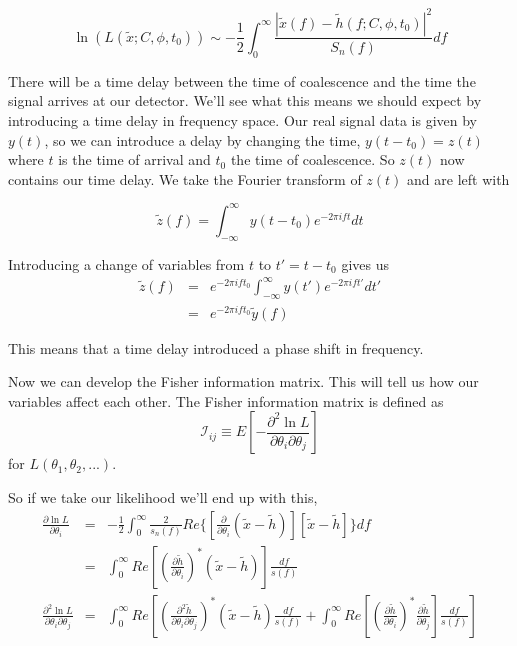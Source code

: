 \documentclass{iopart}
\begin{document}
\begin{equation}
	\ln(L(\tilde{x}; C, \phi, t_0)) \sim -\frac{1}{2}\int_0 ^\infty \frac{|\tilde{x}(f) - \tilde{h}(f; C, \phi, t_0)|^2}{S_n(f)}df
\end{equation}

There will be a time delay between the time of coalescence and the time the signal arrives at our detector. We'll see what this means we should expect by introducing a time delay in frequency space. Our real signal data is given by $y(t)$, so we can introduce a delay by changing the time, $y(t - t_0) = z(t)$ where $t$ is the time of arrival and $t_0$ the time of coalescence. So $z(t)$ now contains our time delay. We take the Fourier transform of $z(t)$ and are left with

\begin{equation}
	\tilde{z}(f) = \int^{\infty}_{-\infty}y(t-t_0)e^{-2\pi ift} dt
\end{equation}

Introducing a change of variables from $t$ to $t' = t - t_0$ gives us
\begin{eqnarray}
	\tilde{z}(f) & = & e^{-2\pi ift_0} \int_{-\infty}^{\infty}y(t')e^{-2\pi ift'} dt' \\
	& = & e^{-2\pi ift_0} \tilde{y}(f)
\end{eqnarray}

This means that a time delay introduced a phase shift in frequency. 

Now we can develop the Fisher information matrix. This will tell us how our variables affect each other. The Fisher information matrix is defined as 
\begin{equation}
\mathcal{I}_{ij} \equiv E[-\frac{\partial^2 \ln L}{\partial \theta_i \partial \theta_j}]
\end{equation}
 for $L(\theta_1, \theta_2, ...)$.

So if we take our likelihood we'll end up with this,
\begin{eqnarray}
	\frac{\partial \ln L}{\partial \theta_i} & = & -\frac{1}{2} \int_0 ^\infty \frac{2}{s_n(f)}Re\{[\frac{\partial}{\partial \theta_i} (\tilde{x} - \tilde{h})][\tilde{x} - \tilde{h}]\}df \\
	& = & \int_0 ^\infty Re[(\frac{\partial \tilde{h}}{\partial \theta_i})^*(\tilde{x} - \tilde{h})]\frac{df}{s(f)} \\
	\frac{\partial^2 \ln L}{\partial \theta_i \partial \theta_j} & = & \int_0 ^\infty Re[(\frac{\partial^2 \tilde{h}}{\partial \theta_i \partial \theta_j})^*(\tilde{x} - \tilde{h})\frac{df}{s(f)} + \int_0 ^\infty Re[(\frac{\partial \tilde{h}}{\partial \theta_i})^*\frac{\partial \tilde{h}}{\partial \theta_j}]\frac{df}{s(f)}] \\
\end{eqnarray}
\end{document}
